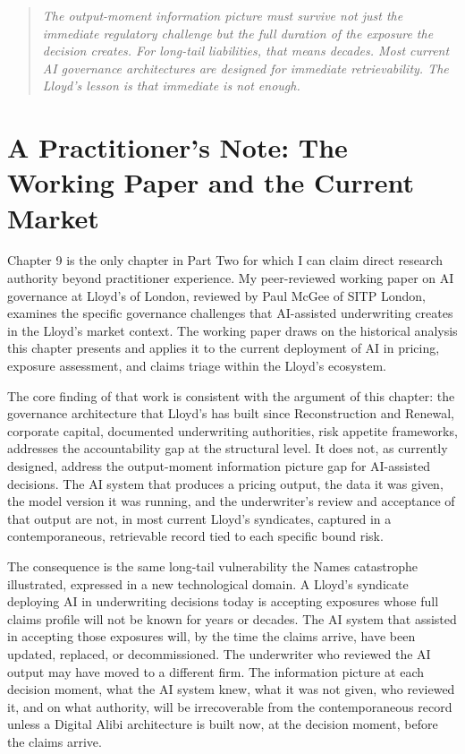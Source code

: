 \begin{quote}
\emph{The output-moment information picture must survive not just the immediate regulatory challenge but the full duration of the exposure the decision creates. For long-tail liabilities, that means decades. Most current AI governance architectures are designed for immediate retrievability. The Lloyd's lesson is that immediate is not enough.}
\end{quote}

\scenebreak

\section{A Practitioner's Note: The Working Paper and the Current Market}

Chapter 9 is the only chapter in Part Two for which I can claim direct research authority beyond practitioner experience. My peer-reviewed working paper on AI governance at Lloyd's of London, reviewed by Paul McGee of SITP London, examines the specific governance challenges that AI-assisted underwriting creates in the Lloyd's market context. The working paper draws on the historical analysis this chapter presents and applies it to the current deployment of AI in pricing, exposure assessment, and claims triage within the Lloyd's ecosystem.

The core finding of that work is consistent with the argument of this chapter: the governance architecture that Lloyd's has built since Reconstruction and Renewal, corporate capital, documented underwriting authorities, risk appetite frameworks, addresses the accountability gap at the structural level. It does not, as currently designed, address the output-moment information picture gap for AI-assisted decisions. The AI system that produces a pricing output, the data it was given, the model version it was running, and the underwriter's review and acceptance of that output are not, in most current Lloyd's syndicates, captured in a contemporaneous, retrievable record tied to each specific bound risk.

The consequence is the same long-tail vulnerability the Names catastrophe illustrated, expressed in a new technological domain. A Lloyd's syndicate deploying AI in underwriting decisions today is accepting exposures whose full claims profile will not be known for years or decades. The AI system that assisted in accepting those exposures will, by the time the claims arrive, have been updated, replaced, or decommissioned. The underwriter who reviewed the AI output may have moved to a different firm. The information picture at each decision moment, what the AI system knew, what it was not given, who reviewed it, and on what authority, will be irrecoverable from the contemporaneous record unless a Digital Alibi architecture is built now, at the decision moment, before the claims arrive.

